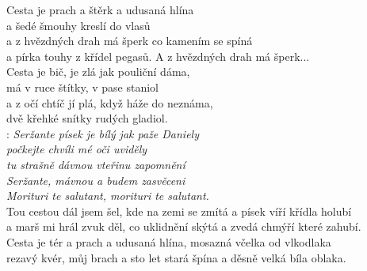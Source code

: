 
Cesta je prach a štěrk a udusaná hlína\\
a šedé šmouhy kreslí do vlasů\\
a z hvězdných drah má šperk co kamením se spíná\\
a pírka touhy z křídel pegasů. A z hvězdných drah má šperk...\\

Cesta je bič, je zlá jak pouliční dáma,\\
má v ruce štítky, v pase staniol\\
a z očí chtíč jí plá, když háže do neznáma,\\
dvě křehké snítky rudých gladiol.\\

\textregistered: \emph{Seržante písek je bílý jak paže Daniely\\
počkejte chvíli mé oči uviděly\\
tu strašně dávnou vteřinu zapomnění\\
Seržante, mávnou a budem zasvěceni\\
Morituri te salutant, morituri te salutant.}\\

Tou cestou dál jsem šel, kde na zemi se zmítá a písek víří křídla holubí\\
a marš mi hrál zvuk děl, co uklidnění skýtá a zvedá chmýří které zahubí.\\

Cesta je tér a prach a udusaná hlína, mosazná včelka od vlkodlaka\\
rezavý kvér, můj brach a sto let stará špína a děsně velká bíla oblaka. \textregistered

\newpage
